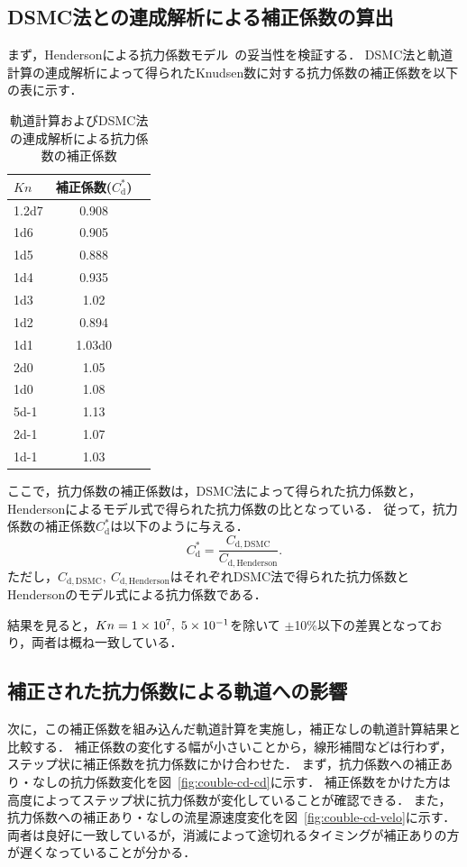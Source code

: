 \subsection{DSMC法との連成解析による補正係数の算出}
まず，Hendersonによる抗力係数モデル~\cite{henderson1976drag}の妥当性を検証する．
DSMC法と軌道計算の連成解析によって得られたKnudsen数に対する抗力係数の補正係数を以下の表に示す．
\begin{table}[H]
\centering
\caption{軌道計算およびDSMC法の連成解析による抗力係数の補正係数}
\begin{tabular}{l|cc}
\hline\hline
$Kn$ & 補正係数($C_\mathrm{d}^*$) \\ \hline
\num{1.2d7} & \num{0.908}   \\
\num{1d6  } & \num{0.905}   \\
\num{1d5  } & \num{0.888}   \\
\num{1d4  } & \num{0.935}   \\
\num{1d3  } & \num{1.02  }  \\
\num{1d2  } & \num{0.894}   \\
\num{1d1  } & \num{1.03d0  }\\
\num{2d0  } & \num{1.05}    \\
\num{1d0  } & \num{1.08  }  \\
\num{5d-1} & \num{1.13  }  \\
\num{2d-1 } & \num{1.07 }   \\
\num{1d-1 } & \num{1.03 }   \\ \hline\hline
\end{tabular}
\end{table}
ここで，抗力係数の補正係数は，DSMC法によって得られた抗力係数と，Hendersonによるモデル式で得られた抗力係数の比となっている．
従って，抗力係数の補正係数$C_\mathrm{d}^*$は以下のように与える．
\begin{equation}
    C_\mathrm{d}^* = \dfrac{C_\mathrm{d,DSMC}}{C_\mathrm{d,Henderson}}.
\end{equation}
ただし，$C_\mathrm{d,DSMC},\ C_\mathrm{d,Henderson}$はそれぞれDSMC法で得られた抗力係数とHendersonのモデル式による抗力係数である．

結果を見ると，$Kn = \num{1d7},\ \num{5d-1}$を除いて
$\pm$10\%以下の差異となっており，両者は概ね一致している．

\subsection{補正された抗力係数による軌道への影響}
次に，この補正係数を組み込んだ軌道計算を実施し，補正なしの軌道計算結果と比較する．
補正係数の変化する幅が小さいことから，線形補間などは行わず，ステップ状に補正係数を抗力係数にかけ合わせた．
まず，抗力係数への補正あり・なしの抗力係数変化を図~\ref{fig:couble-cd-cd}に示す．
補正係数をかけた方は高度によってステップ状に抗力係数が変化していることが確認できる．
また，抗力係数への補正あり・なしの流星源速度変化を図~\ref{fig:couble-cd-velo}に示す．
両者は良好に一致しているが，消滅によって途切れるタイミングが補正ありの方が遅くなっていることが分かる．

